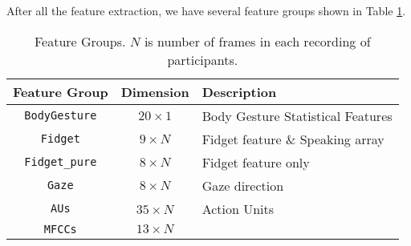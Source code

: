 After all the feature extraction, we have several feature groups shown in Table \ref{tab:feature_group}.
\begin{table}[]
    \centering
    \begin{tabular}{ccl}
    \toprule
        Feature Group & Dimension & Description\\
        \midrule
        \texttt{BodyGesture} & $20\times1$ & Body Gesture Statistical Features\\
        \texttt{Fidget} & $9\times N$ & Fidget feature \& Speaking array\\
        \texttt{Fidget\_pure} & $8\times N$ & Fidget feature only\\
        \texttt{Gaze} & $8\times N$ & Gaze direction \\
        \texttt{AUs} & 3$5\times N$ & Action Units \\
        \texttt{MFCCs} & $13\times N$ & \\
    \bottomrule
    \end{tabular}
    \vspace{0.2cm}
    \caption{Feature Groups. $N$ is number of frames in each recording of participants.}
    \label{tab:feature_group}
    \vspace{-10mm}
\end{table}
\vspace{-0.3cm}
